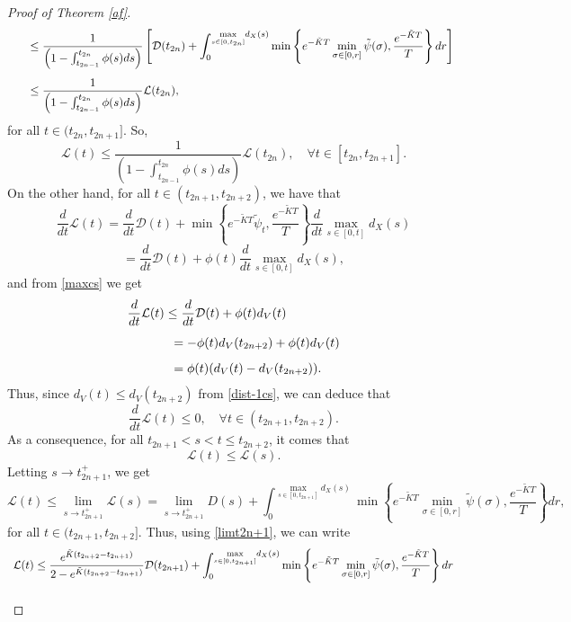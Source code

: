 \documentclass[a4paper,11pt,oneside]{article}
\begin{document}
\begin{proof}[Proof of Theorem \ref{af}]
$$\begin{array}{l}
		\vspace{0.3cm}\displaystyle{\hspace{0.5cm}\leq \frac{1}{\left(1-\int_{t_{2n-1}}^{t_{2n}}\phi(s)ds\right)}\left[\mathcal{D}(t_{2n})+\int_{0}^{\underset{s\in [0,t_{2n}]}{\max}d_{X}(s)}\min\left\{e^{-\tilde KT}\min_{\sigma\in [0,r]}\tilde\psi(\sigma),\frac{e^{-\tilde KT}}{T}\right\}dr\right]}\\
		\displaystyle{\hspace{0.5cm}\leq \frac{1}{\left(1-\int_{t_{2n-1}}^{t_{2n}}\phi(s)ds\right)}\mathcal{L}(t_{2n}),}
	\end{array}$$
	for all $t\in (t_{2n},t_{2n+1}]$. So,
	\begin{equation}\label{lia1}
		\mathcal{L}(t)\leq \frac{1}{\left(1-\int_{t_{2n-1}}^{t_{2n}}\phi(s)ds\right)}\mathcal{L}(t_{2n}),\quad \forall t\in [t_{2n},t_{2n+1}].
	\end{equation}
	On the other hand, for all $t\in (t_{2n+1},t_{2n+2})$, we have that 
	$$\frac{d}{dt}\mathcal{L}(t)=\frac{d}{dt}\mathcal{D}(t)+\min\left\{e^{-\tilde KT}\tilde\psi_{t},\frac{e^{-\tilde KT}}{T}\right\}\frac{d}{dt}\underset{s\in [0,t]}{\max}d_{X}(s)$$$$=\frac{d}{dt}\mathcal{D}(t)+\phi(t)\frac{d}{dt}\underset{s\in [0,t]}{\max}d_{X}(s),$$	
	and from \eqref{maxcs} we get $$\begin{array}{l}
		\vspace{0.3cm}\displaystyle{\frac{d}{dt}\mathcal{L}(t)\leq \frac{d}{dt}\mathcal{D}(t)+\phi(t)d_{V}(t)}\\
		\vspace{0.3cm}\displaystyle{\hspace{1.3cm}=-\phi(t)d_V(t_{2n+2})+\phi(t)d_{V}(t)}\\
		\displaystyle{\hspace{1.3cm}=\phi(t)(d_V(t)-d_V(t_{2n+2})).}
	\end{array}$$
	Thus, since $d_V(t)\leq d_V(t_{2n+2})$ from \eqref{dist-1cs}, we can deduce that
	$$\frac{d}{dt}\mathcal{L}(t)\leq 0,\quad \forall t\in (t_{2n+1},t_{2n+2}).$$
	As a consequence, for all $t_{2n+1}<s<t\leq t_{2n+2}$, it comes that
	$$\mathcal{L}(t)\leq \mathcal{L}(s).$$ 
	Letting $s\to t_{2n+1}^+$, we get
	$$\mathcal{L}(t)\leq \lim_{s\to t_{2n+1}^+}\mathcal{L}(s)=\lim_{s\to t_{2n+1}^+}D(s)+\int_{0}^{\underset{s\in [0,t_{2n+1}]}{\max}d_{X}(s)}\min\left\{e^{-\tilde KT}\min_{\sigma\in [0,r]}\tilde\psi(\sigma),\frac{e^{-\tilde KT}}{T}\right\}dr,$$
	for all $t\in (t_{2n+1},t_{2n+2}]$. Thus, using \eqref{limt2n+1}, we can write
	$$\begin{array}{l}
		\vspace{0.3cm}\displaystyle{\mathcal{L}(t)\leq \frac{e^{\tilde K(t_{2n+2}-t_{2n+1})}}{2-e^{\tilde K(t_{2n+2}-t_{2n+1})}}\mathcal{D}(t_{2n+1})+\int_{0}^{\underset{s\in [0,t_{2n+1}]}{\max}d_{X}(s)}\min\left\{e^{-\tilde KT}\min_{\sigma\in [0,r]}\tilde\psi(\sigma),\frac{e^{-\tilde KT}}{T}\right\}dr}\\	

\end{array}$$
\end{proof}
\end{document}
